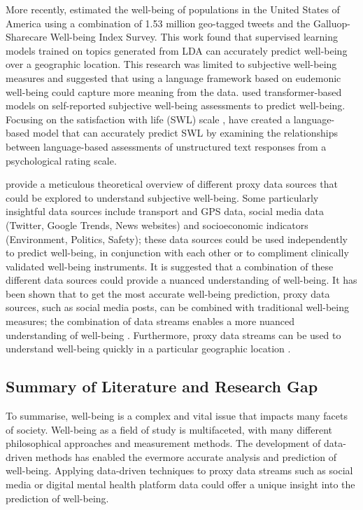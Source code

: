 \documentclass[12pt]{article}
\begin{document}
More recently, \textcite{jaidka_estimating_2020} estimated the well-being of populations in the United States of America using a combination of 1.53 million geo-tagged tweets and the Galluop-Sharecare Well-being Index Survey. This work found that supervised learning models trained on topics generated from LDA can accurately predict well-being over a geographic location. This research was limited to subjective well-being measures and suggested that using a language framework based on eudemonic well-being could capture more meaning from the data.
\textcite{kjell_natural_2022} used transformer-based models on self-reported subjective well-being assessments to predict well-being. Focusing on the satisfaction with life (SWL) scale \parencite{diener_new_2010}, \textcite{kjell_natural_2022} have created a language-based model that can accurately predict SWL by examining the relationships between language-based assessments of unstructured text responses from a psychological rating scale.

\textcite{voukelatou_measuring_2021} provide a meticulous theoretical overview of different proxy data sources that could be explored to understand subjective well-being. Some particularly insightful data sources include transport and GPS data, social media data (Twitter, Google Trends, News websites) and socioeconomic indicators (Environment, Politics, Safety); these data sources could be used independently to predict well-being, in conjunction with each other or to compliment clinically validated well-being instruments. It is suggested that a combination of these different data sources could provide a nuanced understanding of well-being. It has been shown that to get the most accurate well-being prediction, proxy data sources, such as social media posts, can be combined with traditional well-being measures; the combination of data streams enables a more nuanced understanding of well-being \parencite{coppersmith_natural_2018, schwartz_predicting_2016, jaidka_estimating_2020}. Furthermore, proxy data streams can be used to understand well-being quickly in a particular geographic location \parencite{jaidka_estimating_2020}. 


\subsection{Summary of Literature and Research Gap}

To summarise, well-being is a complex and vital issue that impacts many facets of society. Well-being as a field of study is multifaceted, with many different philosophical approaches and measurement methods. The development of data-driven methods has enabled the evermore accurate analysis and prediction of well-being. Applying data-driven techniques to proxy data streams such as social media or digital mental health platform data could offer a unique insight into the prediction of well-being.
\end{document}
